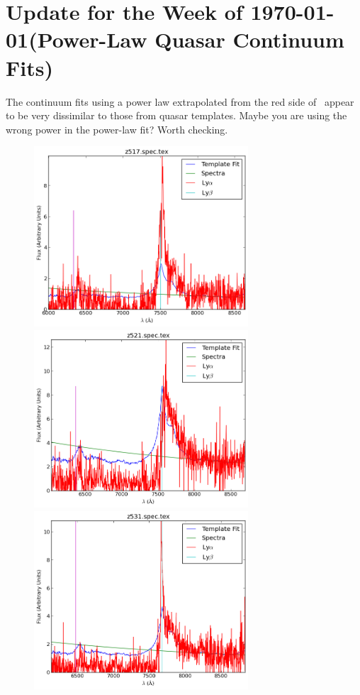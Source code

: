 \documentclass[11pt]{article}
\begin{document}
\section*{Update for the Week of \today (Power-Law Quasar Continuum Fits)}

The continuum fits using a power law extrapolated from the red side of \lya\ appear to be very dissimilar to those from quasar templates. Maybe you are using the wrong power in the power-law fit? Worth checking.

\begin{figure}[h]
  \centering
  \includegraphics[width=8cm]{z517_spec.png}
  \includegraphics[width=8cm]{z521_spec.png}
  \includegraphics[width=8cm]{z531_spec.png}

\end{figure}
\end{document}
